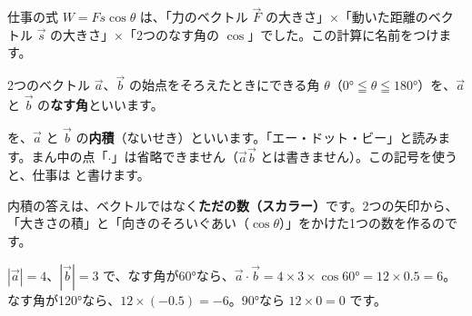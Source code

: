 
\label{bk:4-12:naiseki}
仕事の式 $W=Fs\cos\theta$ は、「力のベクトル $\vec{F}$ の大きさ」×「動いた距離のベクトル $\vec{s}$ の大きさ」×「2つのなす角の $\cos$」でした。この計算に名前をつけます。

\noindent\begin{minipage}[c]{0.4\linewidth}\centering
{}
\end{minipage}\hfill
\begin{minipage}[c]{0.56\linewidth}\raggedright 
2つのベクトル $\vec{a}$、$\vec{b}$ の始点をそろえたときにできる角 $\theta$（$0°\leqq\theta\leqq180°$）を、$\vec{a}$ と $\vec{b}$ の\textbf{なす角}といいます。
\end{minipage}

\par\vspace{4pt}
を、$\vec{a}$ と $\vec{b}$ の\textbf{内積}（ないせき）といいます。「エー・ドット・ビー」と読みます。まん中の点「$\cdot$」は省略できません（$\vec{a}\vec{b}$ とは書きません）。この記号を使うと、仕事は
と書けます。

内積の答えは、ベクトルではなく\textbf{ただの数（スカラー）}です。2つの矢印から、「大きさの積」と「向きのそろいぐあい（$\cos\theta$）」をかけた1つの数を作るのです。

\begin{bkcenter}
\end{bkcenter}

$|\vec{a}|=4$、$|\vec{b}|=3$ で、なす角が60°なら、$\vec{a}\cdot\vec{b}=4\times3\times\cos60°=12\times0.5=6$。なす角が120°なら、$12\times(-0.5)=-6$。90°なら $12\times0=0$ です。

